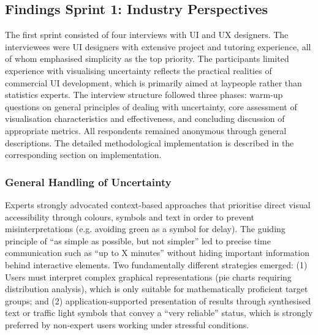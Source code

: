 \documentclass[final,journal,a4paper]{IEEEtran}
\begin{document}
\subsection{Findings Sprint 1: Industry Perspectives}
The first sprint consisted of four interviews with UI and UX designers. The interviewees were UI designers with extensive project and tutoring experience, all of whom emphasised simplicity as the top priority. The participants limited experience with visualising uncertainty reflects the practical realities of commercial UI development, which is primarily aimed at laypeople rather than statistics experts. The interview structure followed three phases: warm-up questions on general principles of dealing with uncertainty, core assessment of visualisation characteristics and effectiveness, and concluding discussion of appropriate metrics. All respondents remained anonymous through general descriptions. The detailed methodological implementation is described in the corresponding section on implementation.

\subsubsection{General Handling of Uncertainty}
Experts strongly advocated context-based approaches that prioritise direct visual accessibility through colours, symbols and text in order to prevent misinterpretations (e.g. avoiding green as a symbol for delay). The guiding principle of ``as simple as possible, but not simpler'' led to precise time communication such as ``up to X minutes'' without hiding important information behind interactive elements. Two fundamentally different strategies emerged: (1) Users must interpret complex graphical representations (pie charts requiring distribution analysis), which is only suitable for mathematically proficient target groups; and (2) application-supported presentation of results through synthesised text or traffic light symbols that convey a ``very reliable'' status, which is strongly preferred by non-expert users working under stressful conditions.
\end{document}
